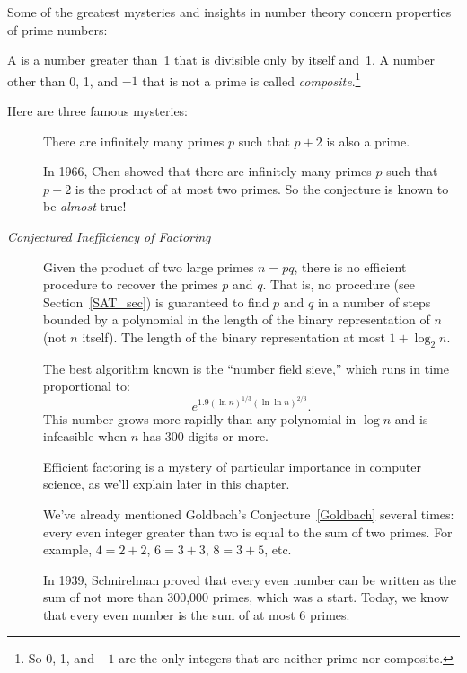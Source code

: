 Some of the greatest mysteries and insights in number theory concern
properties of prime numbers:
\begin{definition}
A  is a number greater than~1 that is divisible only by
itself and~1.  A number other than 0, 1, and $-1$ that is not a prime
is called \emph{composite}.\footnote{So 0, 1, 
and $-1$ are the only integers that are neither prime nor composite.}
\end{definition}

Here are three famous mysteries:


\begin{description}

\item[] There are infinitely many primes
  $p$ such that $p + 2$ is also a prime.

  In 1966, Chen showed that there are infinitely many primes $p$ such
  that $p + 2$ is the product of at most two primes.  So the
  conjecture is known to be \emph{almost} true!

\item[\emph{Conjectured Inefficiency of Factoring}] Given the
  product of two large primes $n = pq$, there is no efficient
  procedure to recover the primes $p$ and $q$.  That is, no
  \emph{} procedure (see Section~\ref{SAT_sec})
  is guaranteed to find $p$ and $q$ in a number of steps bounded by a
  polynomial in the length of the binary representation of $n$ (not
  $n$ itself).  The length of the binary representation at most
  $1+\log_2 n$.

  The best algorithm known is the ``number field sieve,'' which runs
  in time proportional to:
  \[
  e^{1.9(\ln n)^{1/3} (\ln\ln n)^{2/3}}.
  \]
  This number grows more rapidly than any polynomial in $\log n$ and
  is infeasible when $n$ has 300 digits or more.

  Efficient factoring is a mystery of particular importance in
  computer science, as we'll explain later in this chapter.

\item[\emph{}] We've already mentioned Goldbach's
  Conjecture~\ref{Goldbach} several times: every even integer greater
  than two is equal to the sum of two primes.  For example, $4 = 2 +
  2$, $6 = 3 + 3$, $8 = 3 + 5$, etc.

  In 1939, Schnirelman proved that every even number can be written as
  the sum of not more than 300,000 primes, which was a start.  Today,
  we know that every even number is the sum of at most 6 primes.
\end{description}

